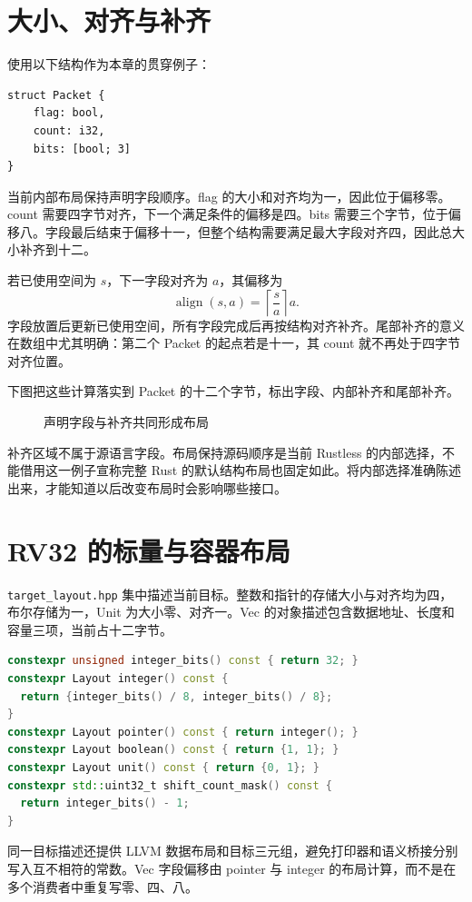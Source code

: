 \section{大小、对齐与补齐}
使用以下结构作为本章的贯穿例子：
\begin{lstlisting}[language=Rustless,caption={包含不同对齐要求的 Packet}]
struct Packet {
    flag: bool,
    count: i32,
    bits: [bool; 3]
}
\end{lstlisting}
当前内部布局保持声明字段顺序。flag 的大小和对齐均为一，因此位于偏移零。count 需要四字节对齐，下一个满足条件的偏移是四。bits 需要三个字节，位于偏移八。字段最后结束于偏移十一，但整个结构需要满足最大字段对齐四，因此总大小补齐到十二。

若已使用空间为 $s$，下一字段对齐为 $a$，其偏移为
\[
  \operatorname{align}(s,a)=\left\lceil\frac{s}{a}\right\rceil a.
\]
字段放置后更新已使用空间，所有字段完成后再按结构对齐补齐。尾部补齐的意义在数组中尤其明确：第二个 Packet 的起点若是十一，其 count 就不再处于四字节对齐位置。

下图把这些计算落实到 Packet 的十二个字节，标出字段、内部补齐和尾部补齐。
\begin{figure}[htbp]\centering
{}
\caption{声明字段与补齐共同形成布局}
\end{figure}

补齐区域不属于源语言字段。布局保持源码顺序是当前 Rustless 的内部选择，不能借用这一例子宣称完整 Rust 的默认结构布局也固定如此。将内部选择准确陈述出来，才能知道以后改变布局时会影响哪些接口。

\section{RV32 的标量与容器布局}
\texttt{target\_layout.hpp} 集中描述当前目标。整数和指针的存储大小与对齐均为四，布尔存储为一，Unit 为大小零、对齐一。Vec 的对象描述包含数据地址、长度和容量三项，当前占十二字节。
\begin{lstlisting}[language=C++,caption={当前目标布局的代表性方法}]
constexpr unsigned integer_bits() const { return 32; }
constexpr Layout integer() const {
  return {integer_bits() / 8, integer_bits() / 8};
}
constexpr Layout pointer() const { return integer(); }
constexpr Layout boolean() const { return {1, 1}; }
constexpr Layout unit() const { return {0, 1}; }
constexpr std::uint32_t shift_count_mask() const {
  return integer_bits() - 1;
}
\end{lstlisting}
同一目标描述还提供 LLVM 数据布局和目标三元组，避免打印器和语义桥接分别写入互不相符的常数。Vec 字段偏移由 pointer 与 integer 的布局计算，而不是在多个消费者中重复写零、四、八。

